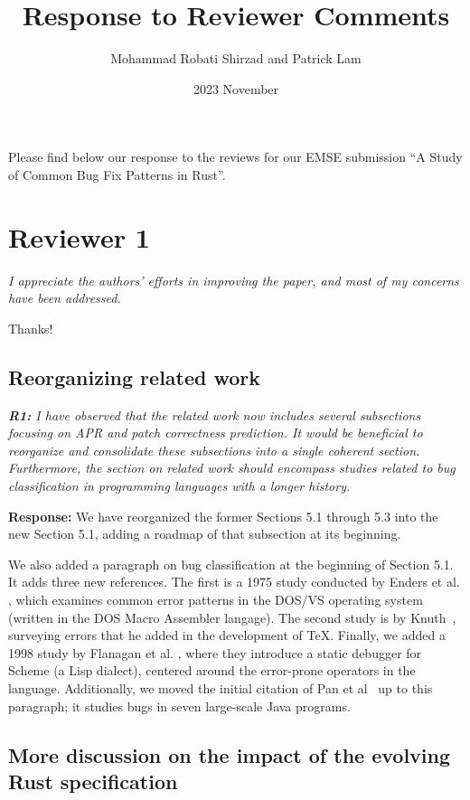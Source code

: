 \documentclass{article}
\title{Response to Reviewer Comments}
\date{2023 November}
\author{Mohammad Robati Shirzad and Patrick Lam}
\begin{document}
\maketitle

Please find below our response to the reviews for our EMSE submission ``A Study of Common Bug Fix Patterns in Rust''.

\section{Reviewer 1}

\textit{I appreciate the authors' efforts in improving the paper, and most of my concerns have been addressed.}

\vspace*{1em}
Thanks!

\subsection{Reorganizing related work}

\textit{\textbf{R1:} I have observed that the related work now includes several subsections focusing on APR and patch correctness prediction. It would be beneficial to reorganize and consolidate these subsections into a single coherent section. Furthermore, the section on related work should encompass studies related to bug classification in programming languages with a longer history.}

\vspace*{1em} \noindent \textbf{Response:} We have reorganized the former Sections 5.1 through 5.3 into the new Section 5.1, adding a roadmap of that subsection at its beginning.

We also added a paragraph on bug classification at the beginning of Section 5.1. It adds three new references. The first is a 1975 study conducted by Enders et al. \cite{endres1975analysis}, which examines common error patterns in the DOS/VS operating system (written in the DOS Macro Assembler langage). The second study is by Knuth~\cite{knuth89:_error_tex}, surveying errors that he added in the development of \TeX. Finally, we added a 1998 study by Flanagan et al. \cite{flanagan1998new}, where they introduce a static debugger for Scheme (a Lisp dialect), centered around the error-prone operators in the language. Additionally, we moved the initial citation of Pan et al~\cite{pan2009toward} up to this paragraph; it studies bugs in seven large-scale Java programs.

\subsection{More discussion on the impact of the evolving Rust specification}
\end{document}
